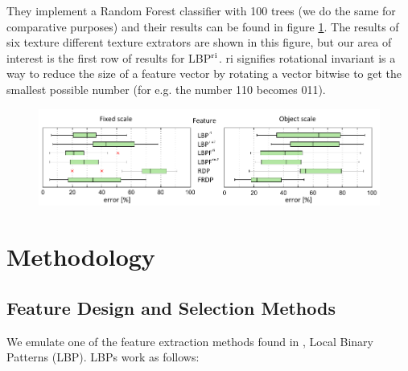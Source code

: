 \begin{multicols}{2}
They implement a Random Forest classifier with 100 trees (we do the same for comparative purposes) and their results can be found in figure \ref{fig:relwork_results}. The results of six texture different texture extrators are shown in this figure, but our area of interest is the first row of results for LBP$^\textnormal{ri}$. ri signifies rotational invariant is a way to reduce the size of a feature vector by rotating a vector bitwise to get the smallest possible number (for e.g. the number 110 becomes 011). 
\begin{figure}
	\centering
	\includegraphics[width=\linewidth]{images/boxes_results.png}
	\label{fig:relwork_results}
\end{figure} 


\section{Methodology}

\subsection{Feature Design and Selection Methods}
We emulate one of the feature extraction methods found in \citet{kylberg2011virus}, Local Binary Patterns (LBP). LBPs work as follows:


\end{multicols}
